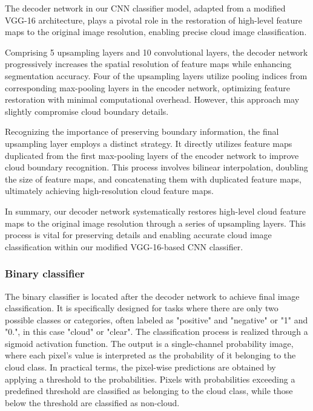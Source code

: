 \documentclass[amt, article]{copernicus}
\begin{document}
The decoder network in our CNN classifier model, adapted from a modified VGG-16 architecture, plays a pivotal role in the restoration of high-level feature maps to the original image resolution, enabling precise cloud image classification.

Comprising 5 upsampling layers and 10 convolutional layers, the decoder network progressively increases the spatial resolution of feature maps while enhancing segmentation accuracy. Four of the upsampling layers utilize pooling indices from corresponding max-pooling layers in the encoder network, optimizing feature restoration with minimal computational overhead. However, this approach may slightly compromise cloud boundary details.

Recognizing the importance of preserving boundary information, the final upsampling layer employs a distinct strategy. It directly utilizes feature maps duplicated from the first max-pooling layers of the encoder network to improve cloud boundary recognition. This process involves bilinear interpolation, doubling the size of feature maps, and concatenating them with duplicated feature maps, ultimately achieving high-resolution cloud feature maps.

In summary, our decoder network systematically restores high-level cloud feature maps to the original image resolution through a series of upsampling layers. This process is vital for preserving details and enabling accurate cloud image classification within our modified VGG-16-based CNN classifier.

\subsubsection{Binary classifier}

The binary classifier is located after the decoder network to achieve final image classification. It is specifically designed for tasks where there are only two possible classes or categories, often labeled as "positive" and "negative" or "1" and "0.", in this case "cloud" or "clear". The classification process is realized through a sigmoid activation function. The output is a single-channel probability image, where each pixel's value is interpreted as the probability of it belonging to the cloud class. In practical terms, the pixel-wise predictions are obtained by applying a threshold to the probabilities. Pixels with probabilities exceeding a predefined threshold are classified as belonging to the cloud class, while those below the threshold are classified as non-cloud.
\end{document}
